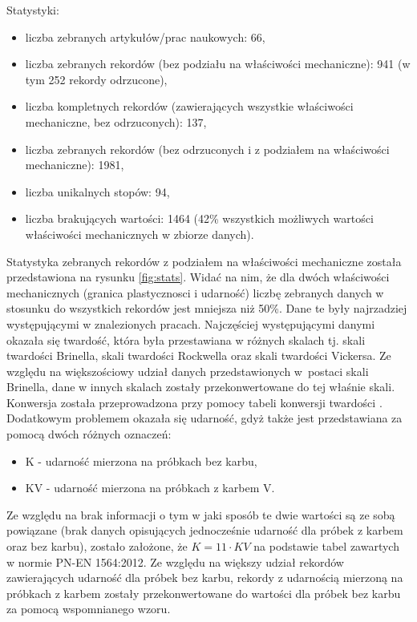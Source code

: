 Statystyki:
\begin{itemize}
    \item liczba zebranych artykułów/prac naukowych: 66,
    \item liczba zebranych rekordów (bez podziału na właściwości mechaniczne): 941 (w tym 252 rekordy odrzucone),
    \item liczba kompletnych rekordów (zawierających wszystkie właściwości mechaniczne, bez odrzuconych): 137,
    \item liczba zebranych rekordów (bez odrzuconych i z podziałem na właściwości mechaniczne): 1981,
    \item liczba unikalnych stopów: 94,
    \item liczba brakujących wartości: 1464 (42\% wszystkich możliwych wartości właściwości mechanicznych w zbiorze danych). 
\end{itemize}

Statystyka zebranych rekordów z podziałem na właściwości mechaniczne została przedstawiona na rysunku \ref{fig:stats}. Widać na nim, że dla dwóch właściwości mechanicznych (granica plastycznosci i udarność) liczbę zebranych danych w stosunku do wszystkich rekordów jest mniejsza niż 50\%. Dane te były najrzadziej występującymi w znalezionych pracach. Najczęściej występującymi danymi okazała się twardość, która była przestawiana w różnych skalach tj. skali twardości Brinella, skali twardości Rockwella oraz skali twardości Vickersa. Ze względu na większościowy udział danych przedstawionych w~postaci skali Brinella, dane w innych skalach zostały przekonwertowane do tej właśnie skali. Konwersja została przeprowadzona przy pomocy tabeli konwersji twardości \cite{hard_conversion}. Dodatkowym problemem okazała się udarność, gdyż także jest przedstawiana za pomocą dwóch różnych oznaczeń:
\begin{itemize}
    \item K - udarność mierzona na próbkach bez karbu,
    \item KV - udarność mierzona na próbkach z karbem V.
\end{itemize}
Ze względu na brak informacji o tym w jaki sposób te dwie wartości są ze sobą powiązane (brak danych opisujących jednocześnie udarność dla próbek z karbem oraz bez karbu), zostało założone, że $K = 11\cdot KV$ na podstawie tabel zawartych w normie PN-EN 1564:2012. Ze względu na większy udział rekordów zawierających udarność dla próbek bez karbu, rekordy z udarnością mierzoną na próbkach z karbem zostały przekonwertowane do wartości dla próbek bez karbu za pomocą wspomnianego wzoru.

